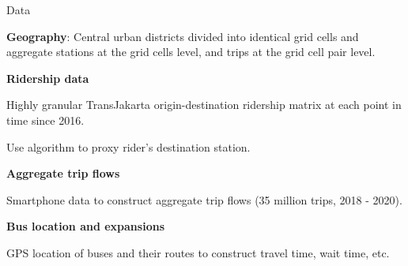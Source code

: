 \documentclass[notes,11pt, aspectratio=169]{beamer}
\newenvironment{wideitemize}{\itemize\addtolength{\itemsep}{0.4em}}{\enditemize}
\begin{document}
\begin{frame}{Data}

	\textbf{Geography}: Central urban districts divided into identical grid cells and aggregate stations at the grid cells level, and trips at the grid cell pair level.\vspace{1em}

	\textbf{Ridership data}
	\begin{wideitemize}
	\item Highly granular TransJakarta origin-destination ridership matrix at each point in time since 2016.
	\item Use algorithm to proxy rider's destination station.
	\end{wideitemize}\vspace{1em}

	\textbf{Aggregate trip flows}
	\begin{wideitemize}
	\item Smartphone data to construct aggregate trip flows (35 million trips, 2018 - 2020).
	\end{wideitemize}\vspace{1em}

	\textbf{Bus location and expansions}
	\begin{wideitemize}
	\item GPS location of buses and their routes to construct travel time, wait time, etc.
	\end{wideitemize}	
\end{frame}
\end{document}
